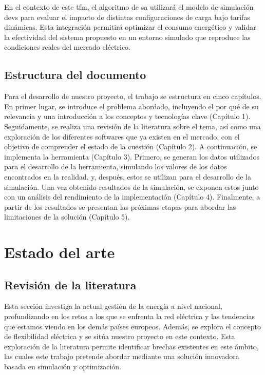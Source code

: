 \documentclass[11pt,a4paper]{book}
\begin{document}
En el contexto de este \gls{tfm}, el algoritmo de \gls{sa} utilizará el modelo de \mbox{simulación} \gls{devs} para evaluar el impacto de distintas configuraciones de carga bajo tarifas dinámicas. Esta integración permitirá optimizar el consumo \mbox{energético} y validar la efectividad del sistema propuesto en un entorno simulado que reproduce las condiciones reales del mercado eléctrico.

\section{Estructura del documento}
Para el desarrollo de nuestro proyecto, el trabajo se estructura en cinco capítulos. En primer lugar, se introduce el problema abordado, incluyendo el por qué de su relevancia y una introducción a los conceptos y tecnologías clave (Capítulo 1). Seguidamente, se realiza una revisión de la literatura sobre el tema, así como una exploración de los diferentes softwares que ya existen en el mercado, con el objetivo de comprender el estado de la cuestión (Capítulo 2). A continuación, se implementa la herramienta (Capítulo 3). Primero, se generan los datos utilizados para el desarrollo de la herramienta, simulando los valores de los datos encontrados en la realidad, y, después, estos se utilizan para el desarrollo de la simulación. Una vez obtenido resultados de la simulación, se exponen estos junto con un análisis del rendimiento de la implementación (Capítulo 4). Finalmente, a partir de los resultados se presentan las próximas etapas para abordar las limitaciones de la solución (Capítulo 5).
\clearpage

\chapter{Estado del arte}

\section{Revisión de la literatura}
Esta sección investiga la actual gestión de la energía a nivel nacional, profundizando en los retos a los que se enfrenta la red eléctrica y las tendencias que estamos viendo en los demás países europeos. Además, se explora el concepto de flexibilidad eléctrica y se sitúa nuestro proyecto en este contexto. Esta exploración de la literatura permite identificar brechas existentes en este ámbito, las cuales este trabajo pretende abordar mediante una solución innovadora basada en simulación y optimización.
\end{document}
